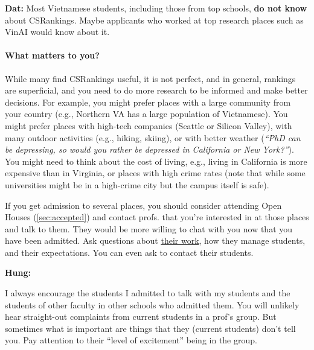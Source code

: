 \documentclass[oneside,11pt,dvipsnames]{book}
\newenvironment{commentbox}[1][]{
  \small
  \begin{mybox}
    {\small \textbf{#1}}
  }{
  \end{mybox}
}
\begin{document}
\begin{commentbox}[Dat:] Most Vietnamese students, including those from top schools, \textbf{do not know} about CSRankings.  Maybe applicants who worked at top research places such as VinAI would know about it.
\end{commentbox}

\paragraph{What matters to you?} While many find CSRankings useful, it is not perfect, and in general, rankings are superficial, and you need to do more research to be informed and make better decisions. For example, you might prefer places with a large community from your country (e.g., Northern VA has a large population of Vietnamese). You might prefer places with high-tech companies (Seattle or Silicon Valley), with many outdoor activities (e.g., hiking, skiing), or with better weather (\emph{``PhD can be depressing, so would you rather be depressed in California or New York?''}).  You might need to think about the cost of living, e.g., living in California is more expensive than in Virginia, or places with high crime rates (note that while some universities might be in a high-crime city but the campus itself is safe).

If you get admission to several places, you should consider attending Open Houses (\autoref{sec:accepted}) and contact profs. that you're interested in at those places and talk to them.  They would be more willing to chat with you now that you have been admitted.  Ask questions about \href{https://github.com/dynaroars/dynaroars.github.io/wiki/Answers-to-Ph.D-Advisor-Guide}{their work}, how they manage students, and their expectations. You can even ask to contact their students.

\begin{commentbox}[Hung:]
  I always encourage the students I admitted to talk with my students and the students of other faculty in other schools who admitted them. You will unlikely hear straight-out complaints from current students in a prof’s group. But sometimes what is important are things that they (current students) don’t tell you. Pay attention to their ``level of excitement'' being in the group.
\end{commentbox}
\end{document}
